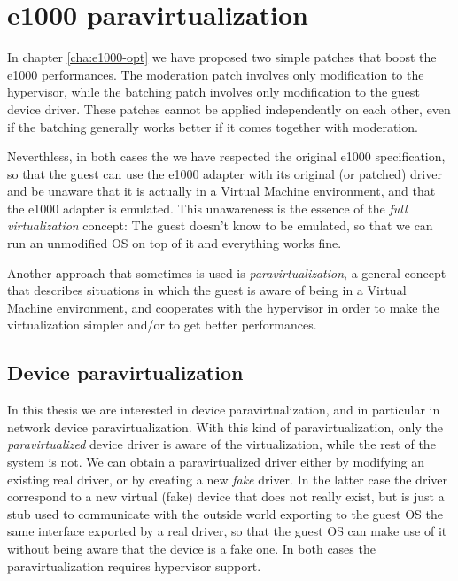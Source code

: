 \chapter{e1000 paravirtualization}
\label{cha:paravirt}
In chapter \ref{cha:e1000-opt} we have proposed two simple patches that boost the e1000 performances.
The moderation patch involves only modification to the hypervisor, while the batching patch involves only modification to the
guest device driver. These patches cannot be applied independently on each other, even if the batching generally works better if
it comes together with moderation.

Neverthless, in both cases the we have respected the original e1000 specification, so that the guest can use the e1000 adapter with its
original (or patched) driver and be unaware that it is actually in a Virtual Machine environment, and that the e1000 adapter is
emulated. This unawareness is the essence of the \emph{full virtualization} concept: The guest doesn't know to be emulated, so
that we can run an unmodified OS on top of it and everything works fine.

\vspace{0.5cm}

Another approach that sometimes is used is \emph{paravirtualization}, a general concept that describes situations in which the 
guest is aware of being in a Virtual Machine environment, and cooperates with the hypervisor in order to make the virtualization simpler
and/or to get better performances.


\section{Device paravirtualization}
In this thesis we are interested in device paravirtualization, and in particular in network device paravirtualization.
With this kind of paravirtualization, only the \emph{paravirtualized} device driver is aware of the virtualization, while the rest of the
system is not.
We can obtain a paravirtualized driver either by modifying an existing real driver, or by creating a new \emph{fake} driver. In the
latter case the driver correspond to a new virtual (fake) device that does not really exist, but is just a stub used to communicate with 
the outside world exporting to the guest OS the same interface exported by a real driver, so that the guest OS
can make use of it without being aware that the device is a fake one.
In both cases the paravirtualization requires hypervisor support.

